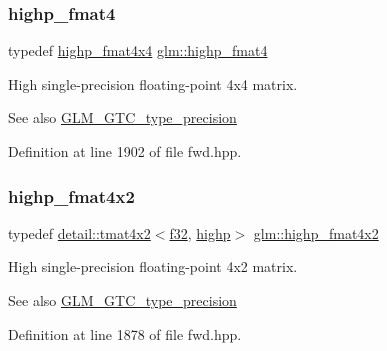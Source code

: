\subsubsection{\texorpdfstring{highp\+\_\+fmat4}{highp\_fmat4}}
{\footnotesize\ttfamily typedef \hyperlink{group__gtc__type__precision_gaf0a98d6caffce89da963d3430e05ddb0}{highp\+\_\+fmat4x4} \hyperlink{group__gtc__type__precision_ga4c7c9823ade7c29e29b5a313949ae502}{glm\+::highp\+\_\+fmat4}}

High single-\/precision floating-\/point 4x4 matrix. \begin{DoxySeeAlso}{See also}
\hyperlink{group__gtc__type__precision}{G\+L\+M\+\_\+\+G\+T\+C\+\_\+type\+\_\+precision} 
\end{DoxySeeAlso}


Definition at line 1902 of file fwd.\+hpp.

\mbox{\label{group__gtc__type__precision_gab3d688f05a884be93c647bce2d8a46f4}} 
\subsubsection{\texorpdfstring{highp\+\_\+fmat4x2}{highp\_fmat4x2}}
{\footnotesize\ttfamily typedef \hyperlink{structglm_1_1detail_1_1tmat4x2}{detail\+::tmat4x2}$<$\hyperlink{group__gtc__type__precision_ga0ec999b57f5330d9021256e96038df04}{f32}, \hyperlink{namespaceglm_a0f04f086094c747d227af4425893f545ac6f7eab42eacbb10d59a58e95e362074}{highp}$>$ \hyperlink{group__gtc__type__precision_gab3d688f05a884be93c647bce2d8a46f4}{glm\+::highp\+\_\+fmat4x2}}

High single-\/precision floating-\/point 4x2 matrix. \begin{DoxySeeAlso}{See also}
\hyperlink{group__gtc__type__precision}{G\+L\+M\+\_\+\+G\+T\+C\+\_\+type\+\_\+precision} 
\end{DoxySeeAlso}


Definition at line 1878 of file fwd.\+hpp.

\mbox{\label{group__gtc__type__precision_ga07f7578fc5a4dd8cdd8a532db25d535f}} 
